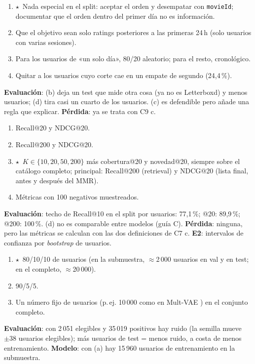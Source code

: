 \documentclass[a4paper,11pt]{article}
\newcommand{\rec}{\ensuremath{\star}}
\begin{document}
\begin{enumerate}[label=\alph*)]
  \item \rec\ Nada especial en el split: aceptar el orden y desempatar con \texttt{movieId}; documentar que el orden dentro del primer día no es información.
  \item Que el objetivo sean solo ratings posteriores a las primeras 24\,h (solo usuarios con varias sesiones).
  \item Para los usuarios de «un solo día», 80/20 aleatorio; para el resto, cronológico.
  \item Quitar a los usuarios cuyo corte cae en un empate de segundo (24,4\,\%).
\end{enumerate}
\textbf{Evaluación}: (b) deja un test que mide otra cosa (ya no es Letterboxd) y menos usuarios; (d) tira casi un cuarto de los usuarios. (c)
es defendible pero añade una regla que explicar. \textbf{Pérdida}: ya se trata con C9 c.

\begin{enumerate}[label=\alph*)]
  \item Recall@20 y NDCG@20.
  \item Recall@200 y NDCG@20.
  \item \rec\ $K\in\{10,20,50,200\}$ más cobertura@20 y novedad@20, siempre sobre el catálogo completo; principal: Recall@200 (retrieval) y NDCG@20 (lista final, antes y después del MMR).
  \item Métricas con 100 negativos muestreados.
\end{enumerate}
\textbf{Evaluación}: techo de Recall@10 en el split por usuarios: 77,1\,\%; @20: 89,9\,\%; @200: 100\,\%. (d) no es comparable entre modelos
(guía C). \textbf{Pérdida}: ninguna, pero las métricas se calculan con las dos definiciones de C7 c. \textbf{E2}: intervalos de confianza por \emph{bootstrap} de usuarios.

\begin{enumerate}[label=\alph*)]
  \item \rec\ 80/10/10 de usuarios (en la submuestra, $\approx$2\,000 usuarios en val y en test; en el completo, $\approx$20\,000).
  \item 90/5/5.
  \item Un número fijo de usuarios (p.\,ej. 10\,000 como en Mult-VAE \cite{liang2018}) en el conjunto completo.
\end{enumerate}
\textbf{Evaluación}: con 2\,051 elegibles y 35\,019 positivos hay ruido (la semilla mueve $\pm38$ usuarios elegibles); más usuarios de test = menos ruido, a costa de
menos entrenamiento. \textbf{Modelo}: con (a) hay 15\,960 usuarios de entrenamiento en la submuestra.
\end{document}
